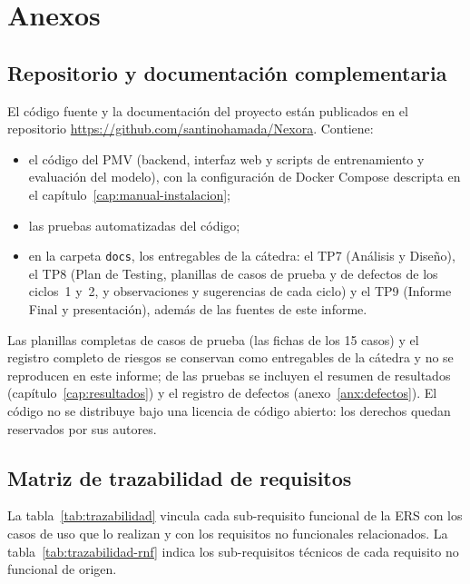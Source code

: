 \chapter{Anexos}

\section{Repositorio y documentación complementaria}\label{anx:repositorio}

El código fuente y la documentación del proyecto están publicados en el repositorio \url{https://github.com/santinohamada/Nexora}. Contiene:
\begin{itemize}
  \item el código del PMV (backend, interfaz web y scripts de entrenamiento y evaluación del modelo), con la configuración de Docker Compose descripta en el capítulo~\ref{cap:manual-instalacion};
  \item las pruebas automatizadas del código;
  \item en la carpeta \texttt{docs}, los entregables de la cátedra: el TP7 (Análisis y Diseño), el TP8 (Plan de Testing, planillas de casos de prueba y de defectos de los ciclos~1 y~2, y observaciones y sugerencias de cada ciclo) y el TP9 (Informe Final y presentación), además de las fuentes de este informe.
\end{itemize}

Las planillas completas de casos de prueba (las fichas de los 15 casos) y el registro completo de riesgos se conservan como entregables de la cátedra y no se reproducen en este informe; de las pruebas se incluyen el resumen de resultados (capítulo~\ref{cap:resultados}) y el registro de defectos (anexo~\ref{anx:defectos}). El código no se distribuye bajo una licencia de código abierto: los derechos quedan reservados por sus autores.

\section{Matriz de trazabilidad de requisitos}\label{anx:trazabilidad}

La tabla~\ref{tab:trazabilidad} vincula cada sub-requisito funcional de la ERS con los casos de uso que lo realizan y con los requisitos no funcionales relacionados. La tabla~\ref{tab:trazabilidad-rnf} indica los sub-requisitos técnicos de cada requisito no funcional de origen.

